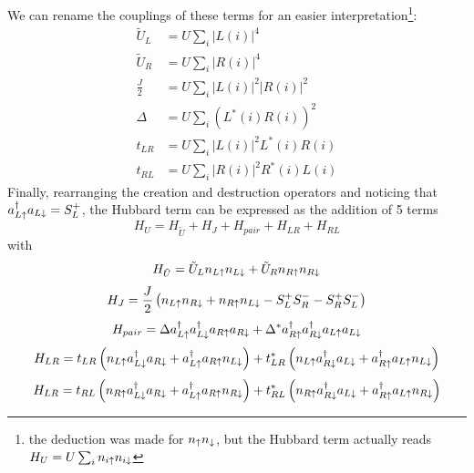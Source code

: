 We can rename the couplings of these terms for an easier interpretation\footnote{the deduction was made for $n_\uparrow n_\downarrow$, but the Hubbard term actually reads $H_U = U\sum_i n_{i\uparrow}n_{i\downarrow}$}:
\begin{equation}
  \begin{split}
    \tilde{U}_L &= U\sum_i |L(i)|^4\\
    \tilde{U}_R &= U\sum_i  |R(i)|^4\\
    \frac{J}{2} &= U\sum_i  |L(i)|^2|R(i)|^2\\
    \Delta &= U\sum_i  (L^*(i)R(i))^2\\
    t_{LR} &= U\sum_i  |L(i)|^2L^*(i)R(i)\\
    t_{RL} &= U\sum_i  |R(i)|^2R^*(i)L(i)
  \end{split}
\label{rename}
\end{equation}
Finally, rearranging the creation and destruction operators and noticing that $a^{\dagger}_{L\uparrow}a_{L\downarrow} = S^+_L$, the Hubbard term can be expressed as the addition of 5 terms
\begin{equation*}
  H_U = H_{\tilde{U}} + H_J + H_{pair} + H_{LR} + H_{RL}
\end{equation*}
with
\begin{equation}
  H_{\tilde{U}} = \tilde{U}_L n_{L\uparrow}n_{L\downarrow}+
                  \tilde{U}_R n_{R\uparrow}n_{R\downarrow}
\end{equation}
\begin{equation}
  H_{J} =\frac{J}{2}\left(n_{L\uparrow}n_{R\downarrow} + n_{R\uparrow}n_{L\downarrow}-
              S^+_LS^-_R - S^+_RS^-_L \right)
\label{Jraw}
\end{equation}
\begin{equation}
  H_{pair} = \Delta a^{\dagger}_{L\uparrow}a^{\dagger}_{L\downarrow}a_{R\uparrow}a_{R\downarrow}+
             \Delta^* a^{\dagger}_{R\uparrow}a^{\dagger}_{R\downarrow}a_{L\uparrow}a_{L\downarrow}
\end{equation}
\begin{equation}
  H_{LR} = t_{LR} \left(n_{L\uparrow}a^{\dagger}_{L\downarrow}a_{R\downarrow}+
                   a^{\dagger}_{L\uparrow}a_{R\uparrow}n_{L\downarrow}\right)+
           t^*_{LR} \left(n_{L\uparrow}a^{\dagger}_{R\downarrow}a_{L\downarrow}+
                   a^{\dagger}_{R\uparrow}a_{L\uparrow}n_{L\downarrow}\right)
\end{equation}
\begin{equation}
  H_{LR} = t_{RL} \left(n_{R\uparrow}a^{\dagger}_{L\downarrow}a_{R\downarrow}+
                   a^{\dagger}_{L\uparrow}a_{R\uparrow}n_{R\downarrow}\right)+
           t^*_{RL} \left(n_{R\uparrow}a^{\dagger}_{R\downarrow}a_{L\downarrow}+
                   a^{\dagger}_{R\uparrow}a_{L\uparrow}n_{R\downarrow}\right)
\end{equation}

